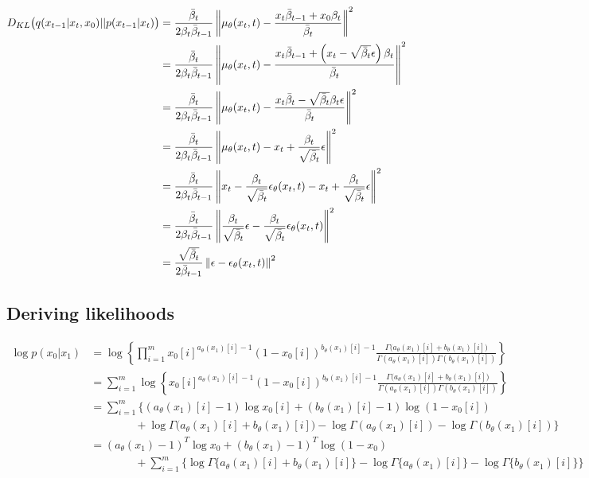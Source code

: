 \begin{align}
D_{KL}\big(q(x_{t-1}|x_t, x_0)||p(x_{t-1}|x_t)\big)
&=
\frac{\bar\beta_{t}}{2\beta_t \bar\beta_{t-1}}
\left\lVert
\mu_\theta(x_t,t)-\frac{
     {x_t\bar\beta_{t-1}}
     +{x_0\beta_t}
     }{\bar\beta_{t}}\right\rVert^2\\
&=
\frac{\bar\beta_{t}}{2\beta_t \bar\beta_{t-1}}
\left\lVert
\mu_\theta(x_t,t)-\frac{
     {x_t\bar\beta_{t-1}}
     +{\left(x_t - \sqrt{\bar\beta_t}\epsilon\right)
     \beta_t}
     }{\bar\beta_{t}}\right\rVert^2\\
&=
\frac{\bar\beta_{t}}{2\beta_t \bar\beta_{t-1}}
\left\lVert
\mu_\theta(x_t,t)-\frac{
     {x_t\bar\beta_{t}}
     -{\sqrt{\bar\beta_t}\beta_t\epsilon
     }
     }{\bar\beta_{t}}\right\rVert^2\\
&=
\frac{\bar\beta_{t}}{2\beta_t \bar\beta_{t-1}}
\left\lVert
\mu_\theta(x_t,t)-x_t+\frac{
     {\beta_t
     }
     }{\sqrt{\bar\beta_t}}\epsilon\right\rVert^2\\
&=
\frac{\bar\beta_{t}}{2\beta_t \bar\beta_{t-1}}
\left\lVert
x_t-\frac{\beta_t}{\sqrt{\bar\beta_t}}\epsilon_\theta(x_t,t)
-x_t+\frac{
     {\beta_t
     }
     }{\sqrt{\bar\beta_t}}\epsilon\right\rVert^2\\
&=
\frac{\bar\beta_{t}}{2\beta_t \bar\beta_{t-1}}
\left\lVert
\frac{
     {\beta_t
     }
     }{\sqrt{\bar\beta_t}}\epsilon
     -\frac{\beta_t}{\sqrt{\bar\beta_t}}\epsilon_\theta(x_t,t)
     \right\rVert^2\\
&=
\frac{\sqrt{\bar\beta_t}}{2\bar\beta_{t-1}}
\left\lVert
\epsilon
     -\epsilon_\theta(x_t,t)
     \right\rVert^2\\
\end{align}


\subsection{Deriving likelihoods}
\begin{align}
    \log p(x_0|x_1)
    &= \log\left\{\prod_{i=1}^m
    x_0[i]^{a_\theta(x_1)[i]-1}
    (1-x_0[i])^{b_\theta(x_1)[i]-1}
    \frac
        {\Gamma\big(a_\theta(x_1)[i] + b_\theta(x_1)[i]\big)}
        {\Gamma(a_\theta(x_1)[i]) \Gamma( b_\theta(x_1)[i])}
    \right\}
    \\
    &= \sum_{i=1}^m\log\left\{
    x_0[i]^{a_\theta(x_1)[i]-1}
    (1-x_0[i])^{b_\theta(x_1)[i]-1}
    \frac
        {\Gamma\big(a_\theta(x_1)[i] + b_\theta(x_1)[i]\big)}
        {\Gamma(a_\theta(x_1)[i]) \Gamma( b_\theta(x_1)[i])}
    \right\}
    \\
    &= \sum_{i=1}^m\bigg\{
    (a_\theta(x_1)[i]-1)\log x_0[i]
    +
    (b_\theta(x_1)[i]-1)\log (1-x_0[i])
    \\
    &\qquad\qquad
    +
    \log\Gamma\big(a_\theta(x_1)[i] + b_\theta(x_1)[i]\big)
    -
    \log \Gamma(a_\theta(x_1)[i])
    -
    \log\Gamma( b_\theta(x_1)[i])
    \bigg\}
    \\
    &=
    (a_\theta(x_1)-1)^T\log x_0
    +
    (b_\theta(x_1)-1)^T\log (1-x_0)
    \\
    &\qquad\qquad
    +\sum_{i=1}^m\bigg\{
    \log\Gamma\big\{a_\theta(x_1)[i] + b_\theta(x_1)[i]\big\}
    -
    \log \Gamma\big\{a_\theta(x_1)[i]\big\}
    -
    \log\Gamma\big\{ b_\theta(x_1)[i]\big\}
    \bigg\}
\end{align}